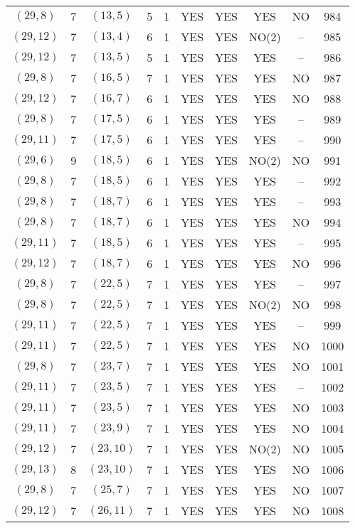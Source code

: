 \begin{longtable}{|c|c|c|c|c|c|c|c|c|c|}
$(29, 8)$ & 7 & $(13, 5)$ & 5 & 1 & YES & YES & YES & NO & 984\\
$(29, 12)$ & 7 & $(13, 4)$ & 6 & 1 & YES & YES & NO(2) & -- & 985\\
$(29, 12)$ & 7 & $(13, 5)$ & 5 & 1 & YES & YES & YES & -- & 986\\
$(29, 8)$ & 7 & $(16, 5)$ & 7 & 1 & YES & YES & YES & NO & 987\\
$(29, 12)$ & 7 & $(16, 7)$ & 6 & 1 & YES & YES & YES & NO & 988\\
$(29, 8)$ & 7 & $(17, 5)$ & 6 & 1 & YES & YES & YES & -- & 989\\
$(29, 11)$ & 7 & $(17, 5)$ & 6 & 1 & YES & YES & YES & -- & 990\\
$(29, 6)$ & 9 & $(18, 5)$ & 6 & 1 & YES & YES & NO(2) & NO & 991\\
$(29, 8)$ & 7 & $(18, 5)$ & 6 & 1 & YES & YES & YES & -- & 992\\
$(29, 8)$ & 7 & $(18, 7)$ & 6 & 1 & YES & YES & YES & -- & 993\\
$(29, 8)$ & 7 & $(18, 7)$ & 6 & 1 & YES & YES & YES & NO & 994\\
$(29, 11)$ & 7 & $(18, 5)$ & 6 & 1 & YES & YES & YES & -- & 995\\
$(29, 12)$ & 7 & $(18, 7)$ & 6 & 1 & YES & YES & YES & NO & 996\\
$(29, 8)$ & 7 & $(22, 5)$ & 7 & 1 & YES & YES & YES & -- & 997\\
$(29, 8)$ & 7 & $(22, 5)$ & 7 & 1 & YES & YES & NO(2) & NO & 998\\
$(29, 11)$ & 7 & $(22, 5)$ & 7 & 1 & YES & YES & YES & -- & 999\\
$(29, 11)$ & 7 & $(22, 5)$ & 7 & 1 & YES & YES & YES & NO & 1000\\
$(29, 8)$ & 7 & $(23, 7)$ & 7 & 1 & YES & YES & YES & NO & 1001\\
$(29, 11)$ & 7 & $(23, 5)$ & 7 & 1 & YES & YES & YES & -- & 1002\\
$(29, 11)$ & 7 & $(23, 5)$ & 7 & 1 & YES & YES & YES & NO & 1003\\
$(29, 11)$ & 7 & $(23, 9)$ & 7 & 1 & YES & YES & YES & NO & 1004\\
$(29, 12)$ & 7 & $(23, 10)$ & 7 & 1 & YES & YES & NO(2) & NO & 1005\\
$(29, 13)$ & 8 & $(23, 10)$ & 7 & 1 & YES & YES & YES & NO & 1006\\
$(29, 8)$ & 7 & $(25, 7)$ & 7 & 1 & YES & YES & YES & NO & 1007\\
$(29, 12)$ & 7 & $(26, 11)$ & 7 & 1 & YES & YES & YES & NO & 1008\\

\end{longtable}
